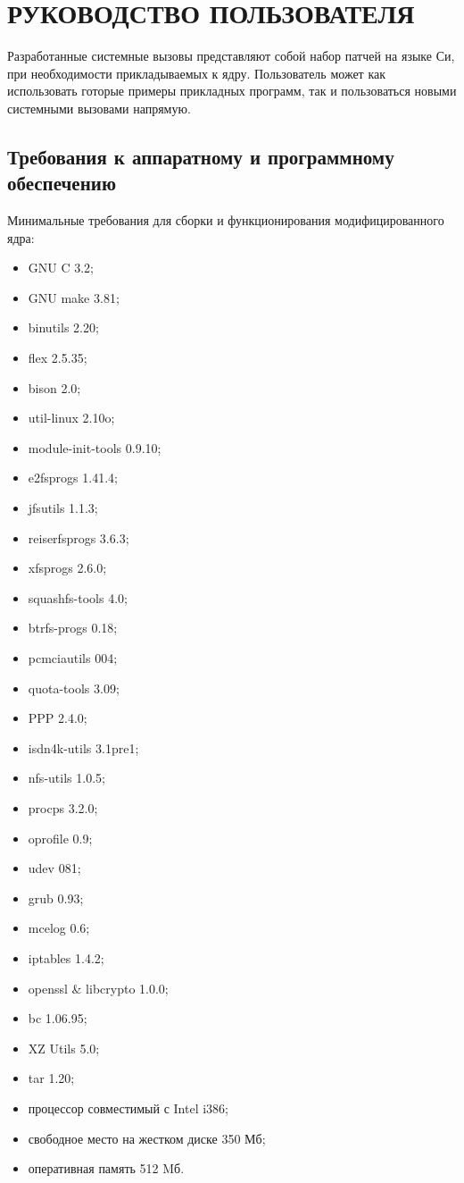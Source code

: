 \section{РУКОВОДСТВО ПОЛЬЗОВАТЕЛЯ}
\label{sec:manual}

Разработанные системные вызовы представляют собой набор патчей на языке Си, при
необходимости прикладываемых к ядру. Пользователь может как использовать готорые
примеры прикладных программ, так и пользоваться новыми системными вызовами
напрямую.

\subsection{Требования к аппаратному и программному обеспечению}

Минимальные требования для сборки и функционирования модифицированного ядра:
\begin{itemize}
\item GNU C 3.2;
\item GNU make 3.81;
\item binutils 2.20;
\item flex 2.5.35;
\item bison 2.0;
\item util-linux 2.10o;
\item module-init-tools 0.9.10;
\item e2fsprogs 1.41.4;
\item jfsutils 1.1.3;
\item reiserfsprogs 3.6.3;
\item xfsprogs 2.6.0;
\item squashfs-tools 4.0;
\item btrfs-progs 0.18;
\item pcmciautils 004;
\item quota-tools 3.09;
\item PPP 2.4.0;
\item isdn4k-utils 3.1pre1;
\item nfs-utils 1.0.5;
\item procps 3.2.0;
\item oprofile 0.9;
\item udev 081;
\item grub 0.93;
\item mcelog 0.6;
\item iptables 1.4.2;
\item openssl \& libcrypto 1.0.0;
\item bc 1.06.95;
\item XZ Utils 5.0;
\item tar 1.20;
\item процессор совместимый с Intel i386;
\item свободное место на жестком диске 350 Мб;
\item оперативная память 512 Mб.
\end{itemize}

